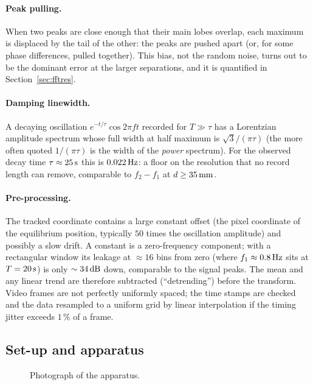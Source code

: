 \paragraph{Peak pulling.} When two peaks are close enough that their main lobes overlap, each maximum is displaced by the tail of the other: the peaks are pushed apart (or, for some phase differences, pulled together). This bias, not the random noise, turns out to be the dominant error at the larger separations, and it is quantified in Section~\ref{sec:fftres}.

\paragraph{Damping linewidth.} A decaying oscillation $e^{-t/\tau}\cos2\pi ft$ recorded for $T\gg\tau$ has a Lorentzian amplitude spectrum whose full width at half maximum is $\sqrt3/(\pi\tau)$ (the more often quoted $1/(\pi\tau)$ is the width of the \emph{power} spectrum). For the observed decay time $\tau\approx25\,\mathrm{s}$ this is $0.022\,\mathrm{Hz}$: a floor on the resolution that no record length can remove, comparable to $f_2-f_1$ at $d\geq35\,\mathrm{mm}$.

\paragraph{Pre-processing.} The tracked coordinate contains a large constant offset (the pixel coordinate of the equilibrium position, typically $50$ times the oscillation amplitude) and possibly a slow drift. A constant is a zero-frequency component; with a rectangular window its leakage at $\approx16$ bins from zero (where $f_1\approx0.8\,\mathrm{Hz}$ sits at $T=20\,\mathrm{s}$) is only $\sim34\,\mathrm{dB}$ down, comparable to the signal peaks. The mean and any linear trend are therefore subtracted (``detrending'') before the transform. Video frames are not perfectly uniformly spaced; the time stamps are checked and the data resampled to a uniform grid by linear interpolation if the timing jitter exceeds $1\,\%$ of a frame.

\subsection{Set-up and apparatus}

\begin{figure}[htbp]
\centering
{}
\caption{Photograph of the apparatus. }
\label{fig:photo}
\end{figure}

